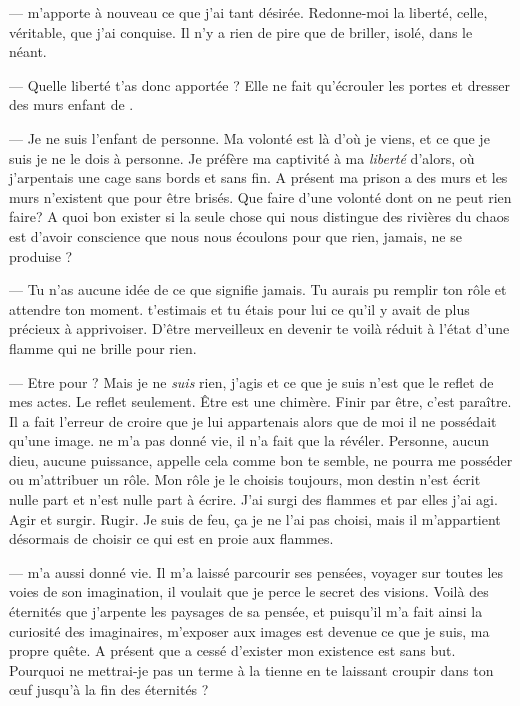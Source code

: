 --- \Auga m'apporte à nouveau ce que j'ai tant désirée. Redonne-moi la liberté, celle, véritable, que j'ai conquise. Il n'y a rien de pire que de briller, isolé, dans le néant. \n

--- Quelle liberté t'as donc apportée \Auga? Elle ne fait qu'écrouler les portes et dresser des murs enfant de \Mey. \n

--- Je ne suis l'enfant de personne. Ma volonté est là d'où je viens, et ce que je suis je ne le dois à personne. Je préfère ma captivité à ma \textit{liberté} d'alors, où j'arpentais une cage sans bords et sans fin. A présent ma prison a des murs et les murs n'existent que pour être brisés. Que faire d'une volonté dont on ne peut rien faire? A quoi bon exister si la seule chose qui nous distingue des rivières du chaos est d'avoir conscience que nous nous écoulons pour que rien, jamais, ne se produise ?\n

--- Tu n'as aucune idée de ce que signifie jamais. Tu aurais pu remplir ton rôle et attendre ton moment. \Mey t'estimais et tu étais pour lui ce qu'il y avait de plus précieux à apprivoiser. D'être merveilleux en devenir te voilà réduit à l'état d'une flamme qui ne brille pour rien.\n

---  Etre pour \Mey? Mais je ne \textit{suis} rien, j'agis et ce que je suis n'est que le reflet de mes actes. Le reflet seulement. Être est une chimère. Finir par être, c'est paraître. Il a fait l'erreur de croire que je lui appartenais alors que de moi il ne possédait qu'une image. \Mey ne m'a pas donné vie, il n'a fait que la révéler. Personne, aucun dieu, aucune puissance, appelle cela comme bon te semble, ne pourra me posséder ou m'attribuer un rôle. Mon rôle je le choisis toujours, mon destin n'est écrit nulle part et n'est nulle part à écrire. J'ai surgi des flammes et par elles j'ai agi. Agir et surgir. Rugir. Je suis de feu, ça je ne l'ai pas choisi, mais il m'appartient désormais de choisir ce qui est en proie aux flammes.


--- \Mey m'a aussi donné vie. Il m'a laissé parcourir ses pensées, voyager sur toutes les voies de son imagination, il voulait que je perce le secret des visions. Voilà des éternités que j'arpente les paysages de sa pensée, et puisqu'il m'a fait ainsi la curiosité des imaginaires, m'exposer aux images est devenue ce que je suis, ma propre quête. A présent que \Mey a cessé d'exister mon existence est sans but. Pourquoi ne mettrai-je pas un terme à la tienne en te laissant croupir dans ton œuf jusqu'à la fin des éternités ?

